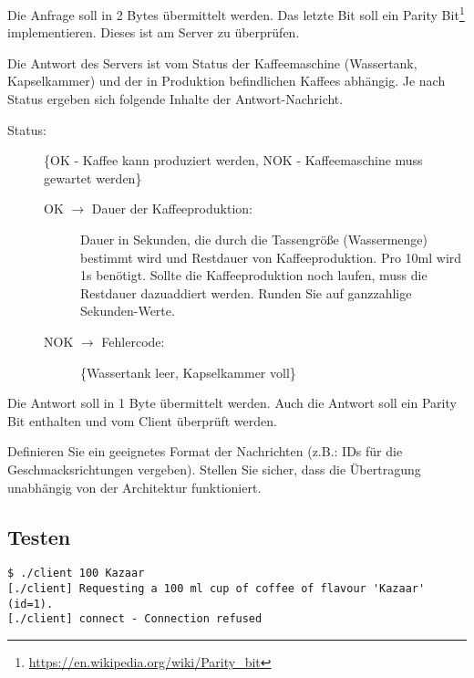Die Anfrage soll in 2 Bytes übermittelt werden. Das letzte Bit soll ein Parity
Bit\footnote{\url{https://en.wikipedia.org/wiki/Parity_bit}}
implementieren. Dieses ist am Server zu überprüfen.

Die Antwort des Servers ist vom Status der Kaffeemaschine (Wassertank,
Kapselkammer) und der in Produktion befindlichen Kaffees abhängig. Je nach
Status ergeben sich folgende Inhalte der Antwort-Nachricht.
%
\begin{description}
\item[Status:] \{OK - Kaffee kann produziert werden, NOK - Kaffeemaschine muss
  gewartet werden\}
  \begin{description}
  \item[OK $\rightarrow$ Dauer der Kaffeeproduktion:] Dauer in Sekunden, die
    durch die Tassengröße (Wassermenge) bestimmt wird und Restdauer von
    Kaffeeproduktion. Pro 10ml wird 1s benötigt. Sollte die Kaffeeproduktion
    noch laufen, muss die Restdauer dazuaddiert werden. Runden Sie auf
    ganzzahlige Sekunden-Werte.
  \item[NOK $\rightarrow$ Fehlercode:] \{Wassertank leer, Kapselkammer voll\}
  \end{description}
\end{description}

Die Antwort soll in 1 Byte übermittelt werden. Auch die Antwort soll ein Parity
Bit enthalten und vom Client überprüft werden.

Definieren Sie ein geeignetes Format der Nachrichten (z.B.: IDs für die
Geschmacksrichtungen vergeben). Stellen Sie sicher, dass die Übertragung
unabhängig von der Architektur funktioniert.

\subsection*{Testen}

\begin{lstlisting}
$ ./client 100 Kazaar
[./client] Requesting a 100 ml cup of coffee of flavour 'Kazaar' (id=1).
[./client] connect - Connection refused
\end{lstlisting}

